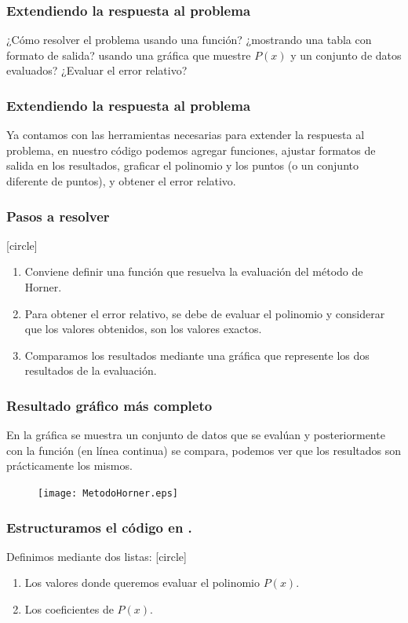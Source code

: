 \begin{frame}
\frametitle{Extendiendo la respuesta al problema}
¿Cómo resolver el problema usando una función? ¿mostrando una tabla con formato de salida? usando una gráfica que muestre $P(x)$ y un conjunto de datos evaluados? ¿Evaluar el error relativo?
\end{frame}
\begin{frame}
\frametitle{Extendiendo la respuesta al problema}
Ya contamos con las herramientas necesarias para extender la respuesta al problema, en nuestro código podemos agregar funciones, ajustar formatos de salida en los resultados, graficar el polinomio y los puntos (o un conjunto diferente de puntos), y obtener el error relativo.
\end{frame}
\begin{frame}
\frametitle{Pasos a resolver}
[circle]
\begin{enumerate}[<+->]
\item Conviene definir una función que resuelva la evaluación del método de Horner.
\item Para obtener el error relativo, se debe de evaluar el polinomio y considerar que los valores obtenidos, son los valores exactos.
\item Comparamos los resultados mediante una gráfica que represente los dos resultados de la evaluación.
\end{enumerate}
\end{frame}
\begin{frame}[fragile]
\frametitle{Resultado gráfico más completo}
En la gráfica se muestra un conjunto de datos que se evalúan y posteriormente con la función (en línea continua) se compara, podemos ver que los resultados son prácticamente los mismos.
\begin{figure}
	\centering
	\texttt{[image: MetodoHorner.eps]} 
\end{figure}
\end{frame}
\begin{frame}[fragile]
\frametitle{Estructuramos el código en \python.}
Definimos mediante dos listas:
[circle]
\begin{enumerate}
\item Los valores donde queremos evaluar el polinomio $P(x)$.
\item Los coeficientes de $P(x)$.
\end{enumerate}
\end{frame}

